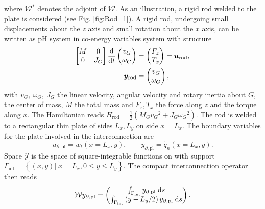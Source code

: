 \documentclass[letterpaper, 10 pt, conference]{ieeeconf}
\begin{document}
where $\mathcal{W}^*$ denotes the adjoint of $\mathcal{W}$. As an illustration, a rigid rod welded to the plate is considered  (see Fig. \ref{fig:Rod_1}). A rigid rod, undergoing small displacements about the $z$ axis and small rotation about the $x$ axis, can be written as pH system in co-energy variables system with structure
\begin{equation}
\begin{aligned}
\begin{bmatrix}
M & 0 \\
0   & J_G \\
\end{bmatrix} 
\displaystyle \diff{}{t}
\begin{pmatrix}
v_G \\ \omega_G \\
\end{pmatrix} & = \begin{pmatrix}
F_z \\ T_x \\
\end{pmatrix} = \bm{u}_{\text{rod}}\vspace{1mm}, \\
\bm{y}_{\text{rod}} &= \begin{pmatrix}
v_G \\ \omega_{G} \\
\end{pmatrix},
\end{aligned}
\end{equation}
with $v_G, \ \omega_{G}, \ J_G$ the linear velocity, angular velocity and rotary inertia about $G$, the center of mass, $M$ the total mass  and $F_z, T_x$ the force along $z$ and the torque along $x$. The Hamiltonian reads $H_{\text{rod}}  = \frac{1}{2} \left(M_G {v_G}^2 + J_G {\omega_G}^2 \right)$. The rod is welded to a rectangular thin plate of sides $L_x, L_y$ on side $x = L_x$. The boundary variables for the plate involved in the interconnection are 
\[u_{\partial, \text{pl}} = w_t(x = L_x, y),  \qquad  y_{\partial, \text{pl}} = \widetilde{q}_n(x = L_x, y).
\]
Space $\mathscr{Y}$ is the space of square-integrable functions on with support $\Gamma_{\text{int}} = \left\{ (x,y) \vert \; x=L_x, 0 \le y \le L_y  \right\}$. The compact interconnection operator then reads
\begin{equation}
\mathcal{W} y_{\partial, \text{pl}} = \begin{pmatrix}
\int_{\Gamma_{\text{int}}} y_{\partial, \text{pl}} \d{s} \\
\int_{\Gamma_{\text{int}}} \left( y - L_y/2 \right) y_{\partial, \text{pl}} \d{s} \\
\end{pmatrix}.
\end{equation}
\end{document}
